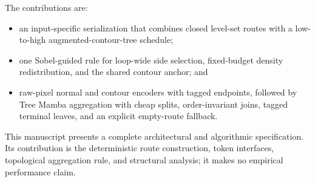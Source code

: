 The contributions are:
\begin{itemize}
    \item an input-specific serialization that combines closed level-set routes with a low-to-high augmented-contour-tree schedule;
    \item one Sobel-guided rule for loop-wide side selection, fixed-budget density redistribution, and the shared contour anchor; and
    \item raw-pixel normal and contour encoders with tagged endpoints, followed by Tree Mamba aggregation with cheap splits, order-invariant joins, tagged terminal leaves, and an explicit empty-route fallback.
\end{itemize}

This manuscript presents a complete architectural and algorithmic specification. Its contribution is the deterministic route construction, token interfaces, topological aggregation rule, and structural analysis; it makes no empirical performance claim.
